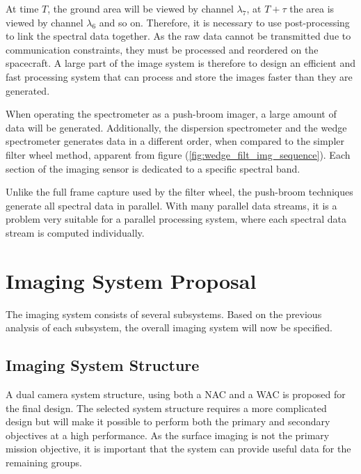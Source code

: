 At time $T$, the ground area will be viewed by channel $\lambda_7$, at $T+\tau$ the area is viewed by channel $\lambda_6$ and so on. Therefore, it is necessary to use post-processing to link the spectral data together. As the raw data cannot be transmitted due to communication constraints, they must be processed and reordered on the spacecraft. A large part of the image system is therefore to design an efficient and fast processing system that can process and store the images faster than they are generated.

When operating the spectrometer as a push-broom imager, a large amount of data will be generated. Additionally, the dispersion spectrometer and the wedge spectrometer generates data in a different order, when compared to the simpler filter wheel method, apparent from figure (\ref{fig:wedge_filt_img_sequence}). Each section of the imaging sensor is dedicated to a specific spectral band. 

Unlike the full frame capture used by the filter wheel, the push-broom techniques generate all spectral data in parallel. With many parallel data streams, it is a problem very suitable for a parallel processing system, where each spectral data stream is computed individually.
\section{Imaging System Proposal}
The imaging system consists of several subsystems. Based on the previous analysis of each subsystem, the overall imaging system will now be specified.
\subsection{Imaging System Structure}
A dual camera system structure, using both a NAC and a WAC is proposed for the final design. The selected system structure requires a more complicated design but will make it possible to perform both the primary and secondary objectives at a high performance. As the surface imaging is not the primary mission objective, it is important that the system can provide useful data for the remaining groups.

